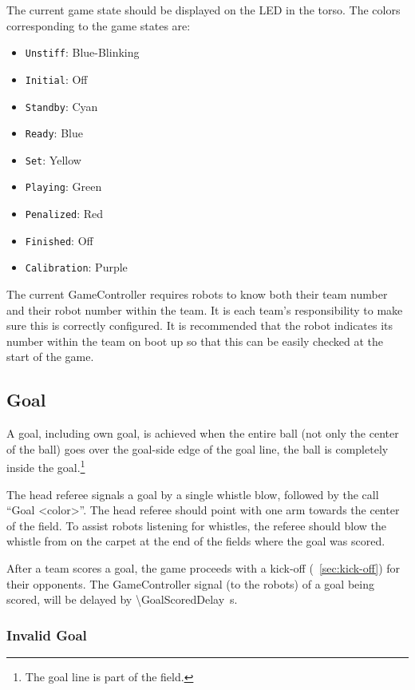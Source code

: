 The current game state should be displayed on the LED in the torso.
The colors corresponding to the game states are:
\begin{itemize}
  \item \texttt{Unstiff}: Blue-Blinking
  \item \texttt{Initial}: Off
  \item \texttt{Standby}: Cyan
  \item \texttt{Ready}: Blue
  \item \texttt{Set}: Yellow
  \item \texttt{Playing}: Green
  \item \texttt{Penalized}: Red
  \item \texttt{Finished}: Off
  \item \texttt{Calibration}: Purple
\end{itemize}

The current GameController requires robots to know both their team number and their robot number within the team.
It is each team's responsibility to make sure this is correctly configured.
It is recommended that the robot indicates its number within the team on boot up so that this can be easily checked at the start of the game.

\subsection{Goal}
\label{sec:goal}

A goal, including own goal, is achieved when the entire ball (not only the center of the ball) goes over the goal-side edge of the goal line, \ie the ball is completely inside the goal.\footnote{
  The goal line is part of the field.
}

The head referee signals a goal by a single whistle blow, followed by the call ``Goal \textless color\textgreater''.
The head referee should point with one arm towards the center of the field.
To assist robots listening for whistles, the referee should blow the whistle from on the carpet at the end of the fields where the goal was scored.

After a team scores a goal, the game proceeds with a kick-off (\cf~\cref{sec:kick-off}) for their opponents.
The GameController signal (to the robots) of a goal being scored, will be delayed by \qty{\GoalScoredDelay}{\second}.

\subsubsection{Invalid Goal}
\label{sec:invalid_goal}


